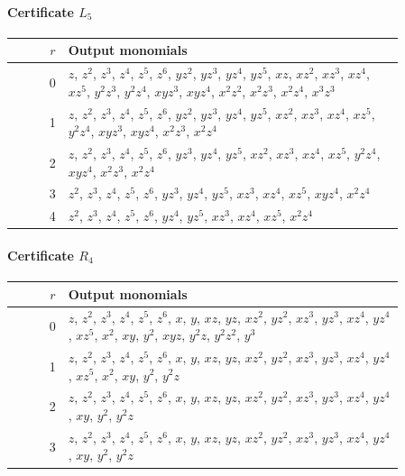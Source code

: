 \documentclass[11pt]{amsart}
\theoremstyle{definition}
\theoremstyle{remark}
\numberwithin{equation}{section}
\begin{document}
\paragraph*{Certificate $L_5$}
\begin{center}
\begin{tabular}{rp{0.86\linewidth}}
$r$ & Output monomials\\\hline
0 & \(z\), \(z^{2}\), \(z^{3}\), \(z^{4}\), \(z^{5}\), \(z^{6}\), \(yz^{2}\), \(yz^{3}\), \(yz^{4}\), \(yz^{5}\), \(xz\), \(xz^{2}\), \(xz^{3}\), \(xz^{4}\), \(xz^{5}\), \(y^{2}z^{3}\), \(y^{2}z^{4}\), \(xyz^{3}\), \(xyz^{4}\), \(x^{2}z^{2}\), \(x^{2}z^{3}\), \(x^{2}z^{4}\), \(x^{3}z^{3}\)\\
1 & \(z\), \(z^{2}\), \(z^{3}\), \(z^{4}\), \(z^{5}\), \(z^{6}\), \(yz^{2}\), \(yz^{3}\), \(yz^{4}\), \(yz^{5}\), \(xz^{2}\), \(xz^{3}\), \(xz^{4}\), \(xz^{5}\), \(y^{2}z^{4}\), \(xyz^{3}\), \(xyz^{4}\), \(x^{2}z^{3}\), \(x^{2}z^{4}\)\\
2 & \(z\), \(z^{2}\), \(z^{3}\), \(z^{4}\), \(z^{5}\), \(z^{6}\), \(yz^{3}\), \(yz^{4}\), \(yz^{5}\), \(xz^{2}\), \(xz^{3}\), \(xz^{4}\), \(xz^{5}\), \(y^{2}z^{4}\), \(xyz^{4}\), \(x^{2}z^{3}\), \(x^{2}z^{4}\)\\
3 & \(z^{2}\), \(z^{3}\), \(z^{4}\), \(z^{5}\), \(z^{6}\), \(yz^{3}\), \(yz^{4}\), \(yz^{5}\), \(xz^{3}\), \(xz^{4}\), \(xz^{5}\), \(xyz^{4}\), \(x^{2}z^{4}\)\\
4 & \(z^{2}\), \(z^{3}\), \(z^{4}\), \(z^{5}\), \(z^{6}\), \(yz^{4}\), \(yz^{5}\), \(xz^{3}\), \(xz^{4}\), \(xz^{5}\), \(x^{2}z^{4}\)\\
\end{tabular}
\end{center}

\paragraph*{Certificate $R_4$}
\begin{center}
\begin{tabular}{rp{0.86\linewidth}}
$r$ & Output monomials\\\hline
0 & \(z\), \(z^{2}\), \(z^{3}\), \(z^{4}\), \(z^{5}\), \(z^{6}\), \(x\), \(y\), \(xz\), \(yz\), \(xz^{2}\), \(yz^{2}\), \(xz^{3}\), \(yz^{3}\), \(xz^{4}\), \(yz^{4}\), \(xz^{5}\), \(x^{2}\), \(xy\), \(y^{2}\), \(xyz\), \(y^{2}z\), \(y^{2}z^{2}\), \(y^{3}\)\\
1 & \(z\), \(z^{2}\), \(z^{3}\), \(z^{4}\), \(z^{5}\), \(z^{6}\), \(x\), \(y\), \(xz\), \(yz\), \(xz^{2}\), \(yz^{2}\), \(xz^{3}\), \(yz^{3}\), \(xz^{4}\), \(yz^{4}\), \(xz^{5}\), \(x^{2}\), \(xy\), \(y^{2}\), \(y^{2}z\)\\
2 & \(z\), \(z^{2}\), \(z^{3}\), \(z^{4}\), \(z^{5}\), \(z^{6}\), \(x\), \(y\), \(xz\), \(yz\), \(xz^{2}\), \(yz^{2}\), \(xz^{3}\), \(yz^{3}\), \(xz^{4}\), \(yz^{4}\), \(xy\), \(y^{2}\), \(y^{2}z\)\\
3 & \(z\), \(z^{2}\), \(z^{3}\), \(z^{4}\), \(z^{5}\), \(z^{6}\), \(x\), \(y\), \(xz\), \(yz\), \(xz^{2}\), \(yz^{2}\), \(xz^{3}\), \(yz^{3}\), \(xz^{4}\), \(yz^{4}\), \(xy\), \(y^{2}\), \(y^{2}z\)\\
\end{tabular}
\end{center}
\end{document}
